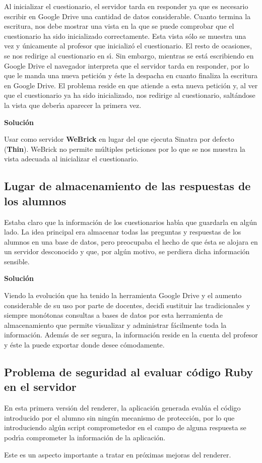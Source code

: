 Al inicializar el cuestionario, el servidor tarda en responder ya que es necesario escribir en Google Drive una cantidad de datos considerable. Cuanto termina la escritura, 
nos debe mostrar una vista en la que se puede comprobar que el cuestionario ha sido inicializado correctamente. Esta vista s\'olo se muestra una vez y \'unicamente al profesor
que inicializ\'o el cuestionario. El resto de ocasiones, se nos redirige al cuestionario en s\'{\i}. 
Sin embargo, mientras se est\'a escribiendo en Google Drive el navegador interpreta que el servidor tarda en responder, por lo que le manda una nueva petici\'on  y \'este la 
despacha en cuanto finaliza la escritura en Google Drive. El problema reside en que atiende a esta nueva petici\'on y, al ver que el cuestionario ya ha sido inicializado,
nos redirige al cuestionario, salt\'andose la vista que deber\'{\i}a aparecer la primera vez.
\bigskip

{\normalsize {\bfseries Soluci\'on}}
\bigskip

Usar como servidor {\bfseries WeBrick} en lugar del que ejecuta Sinatra por defecto ({\bfseries Thin}). WeBrick no permite m\'ultiples peticiones por lo que se nos muestra la 
vista adecuada al inicializar el cuestionario.

\subsection{Lugar de almacenamiento de las respuestas de los alumnos}
\label{subsec:4.1.2}
\bigskip

Estaba claro que la informaci\'on de los cuestionarios hab\'{\i}a que guardarla en alg\'un lado. La idea principal era almacenar todas las preguntas y respuestas de los alumnos
en una base de datos, pero preocupaba el hecho de que \'esta se alojara en un servidor desconocido y que, por alg\'un motivo, se perdiera dicha informaci\'on sensible.
\bigskip

{\normalsize {\bfseries Soluci\'on}}
\bigskip

Viendo la evoluci\'on que ha tenido la herramienta Google Drive y el aumento considerable de su uso por parte de docentes, decid\'{\i} sustituir las tradicionales y siempre mon\'otonas 
consultas a bases de datos por esta herramienta de almacenamiento que permite visualizar y administrar f\'acilmente toda la informaci\'on. Adem\'as de ser segura, la informaci\'on 
reside en la cuenta del profesor y \'este la puede exportar donde desee c\'omodamente.

\subsection{Problema de seguridad al evaluar c\'odigo Ruby en el servidor}
\label{subsec:4.1.3}
\bigskip

En esta primera versi\'on del renderer, la aplicaci\'on generada eval\'ua el c\'odigo introducido por el alumno sin ning\'un mecanismo de protecci\'on, por lo que introduciendo
alg\'un script comprometedor en el campo de alguna respuesta se podr\'{\i}a comprometer la informaci\'on de la aplicaci\'on.

Este es un aspecto importante a tratar en pr\'oximas mejoras del renderer.
